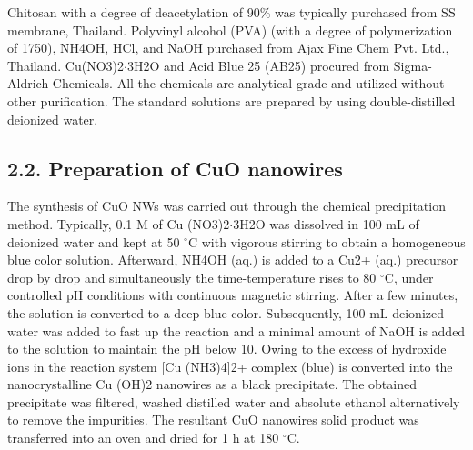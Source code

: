 \documentclass[final,5p,times,twocolumn,authoryear]{elsarticle}
\begin{document}
Chitosan with a degree of deacetylation of 90\% was typically purchased from SS membrane, Thailand. Polyvinyl alcohol (PVA) (with a degree of polymerization of 1750), NH4OH, HCl, and NaOH purchased from Ajax Fine Chem Pvt. Ltd., Thailand. Cu(NO3)2$\cdot$3H2O and Acid Blue 25 (AB25) procured from Sigma-Aldrich Chemicals. All the chemicals are analytical grade and utilized without other purification. The standard solutions are prepared by using double-distilled deionized water.
\subsection{2.2. Preparation of CuO nanowires}
The synthesis of CuO NWs was carried out through the chemical precipitation method. Typically, 0.1 M of Cu (NO3)2$\cdot$3H2O was dissolved in 100 mL of deionized water and kept at 50 $^\circ$C with vigorous stirring to obtain a homogeneous blue color solution. Afterward, NH4OH (aq.) is added to a Cu2+ (aq.) precursor drop by drop and simultaneously the time-temperature rises to 80 $^\circ$C, under controlled pH conditions with continuous magnetic stirring. After a few minutes, the solution is converted to a deep blue color. Subsequently, 100 mL deionized water was added to fast up the reaction and a minimal amount of NaOH is added to the solution to maintain the pH below 10. Owing to the excess of hydroxide ions in the reaction system [Cu (NH3)4]2+ complex (blue) is converted into the nanocrystalline Cu (OH)2 nanowires as a black precipitate. The obtained precipitate was filtered, washed distilled water and absolute ethanol alternatively to remove the impurities. The resultant CuO nanowires solid product was transferred into an oven and dried for 1 h at 180 $^\circ$C.
\end{document}
